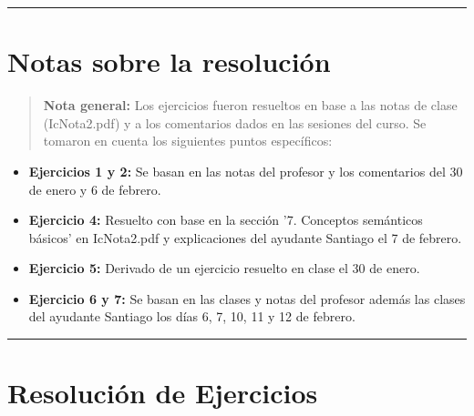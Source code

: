 \documentclass[11pt,letterpaper]{article}
\begin{document}
\bigskip
\hrule height 0.1pt
\bigskip

\section*{Notas sobre la resolución}

\begin{quote}
  \textbf{Nota general:}  
  Los ejercicios fueron resueltos en base a las notas de clase (IcNota2.pdf) y a los comentarios dados en las sesiones del curso. Se tomaron en cuenta los siguientes puntos específicos:  
\end{quote}

\begin{itemize}
   \item \textbf{Ejercicios 1 y 2:} Se basan en las notas del profesor y los comentarios del 30 de enero y 6 de febrero.  
   \item \textbf{Ejercicio 4:} Resuelto con base en la sección '7. Conceptos semánticos básicos' en IcNota2.pdf y explicaciones del ayudante Santiago el 7 de febrero.  
   \item \textbf{Ejercicio 5:} Derivado de un ejercicio resuelto en clase el 30 de enero.
   \item \textbf{Ejercicio 6 y 7:} Se basan en las clases y notas del profesor además las clases del ayudante Santiago los días 6, 7, 10, 11 y 12 de febrero.
\end{itemize}

\bigskip
\hrule height 0.1pt
\bigskip

\section*{Resolución de Ejercicios}
\end{document}

